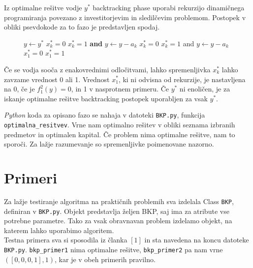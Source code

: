 \documentclass[a4paper, 11pt]{article}
\begin{document}
	Iz optimalne rešitve vodje $y^*$ backtracking phase uporabi rekurzijo dinamičnega programiranja povezano z investitorjevim in sledilčevim problemom. Postopek v obliki psevdokode za to fazo je predstavljen spodaj.

	\begin{figure}[ht]
  	\centering
  		\begin{minipage}{.55\linewidth}
			\begin{algorithmic}[1]
			\STATE $y \leftarrow y^*$
							\STATE $x^*_k = 0$
						\ELSE
							\STATE $x^*_k = 1$ \textbf{and} $y \gets y - a_k$
						\ENDIF
					\ELSE
							\STATE $x^*_k = 0$
						\ELSE
							\STATE $x^*_k = 1$ and $y \gets y - a_k$
						\ENDIF
					\ENDIF
				\ENDFOR
					\STATE $x_1^* = 0$
				\ELSE
					\STATE $x_1^* = 1$
				\ENDIF
			\end{algorithmic}
		\end{minipage}
	\end{figure}
	
	Če se vodja sooča z enakovrednimi odločitvami, lahko spremenljivka $x^*_k$ lahko zavzame vrednost 0 ali 1. Vrednost $x^*_1$, ki ni odvisna od rekurzije, je nastavljena na 0, če je $f_{1}^{2}(y) = 0$, in 1 v nasprotnem primeru. Če $y^*$ ni enoličen, je za iskanje optimalne rešitve backtracking postopek uporabljen za vsak $y^*$.
	
	\textit{Python} koda za opisano fazo se nahaja v datoteki \texttt{BKP.py}, funkcija \texttt{optimalna\_resitvev}. Vrne nam optimalno rešitev v obliki seznama izbranih predmetov in optimalen kapital. Če problem nima optimalne rešitve, nam to sporoči. Za lažje razumevanje so spremenljivke poimenovane nazorno.
	
	\section{Primeri}
	
	Za lažje testiranje algoritma na praktičnih problemih sva izdelala Class \texttt{BKP}, definiran v \texttt{BKP.py}. Objekt predstavlja željen BKP, saj ima za atribute vse potrebne parametre. Tako za vsak obravnavan problem izdelamo objekt, na katerem lahko uporabimo algoritem. \\
	
	Testna primera sva si sposodila iz članka $[1]$ in sta navedena na koncu datoteke \texttt{BKP.py}. \texttt{bkp\_primer1} nima optimalne rešitve, \texttt{bkp\_primer2} pa nam vrne $( [0, 0, 0, 1 ], 1)$, kar je v obeh primerih pravilno.
	
\end{document}
